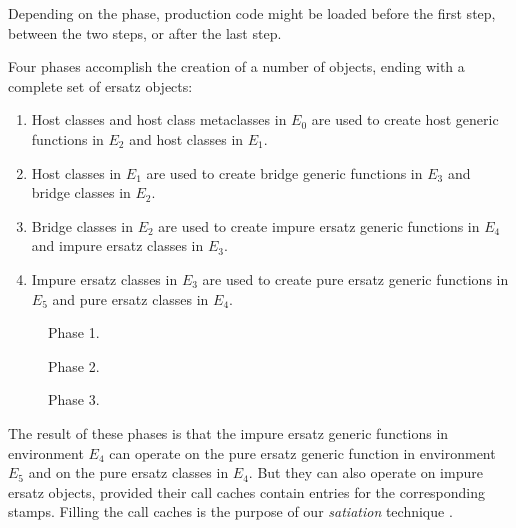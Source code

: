 Depending on the phase, \sicl{} production code might be loaded before
the first step, between the two steps, or after the last step.

Four phases accomplish the creation of a number of objects, ending
with a complete set of ersatz objects:

\begin{enumerate}
\item Host classes and host class metaclasses in $E_0$
  are used to create host generic functions in $E_2$ and host classes
  in $E_1$.
\item Host classes in $E_1$ are used to create bridge
  generic functions in $E_3$ and bridge classes in $E_2$.
\item Bridge classes in $E_2$ are used to create impure
  ersatz generic functions in $E_4$ and impure ersatz classes in
  $E_3$.
\item Impure ersatz classes in $E_3$ are used to create
  pure ersatz generic functions in $E_5$ and pure ersatz classes in
  $E_4$.
\end{enumerate}

\begin{figure}
\begin{center}
\end{center}
\caption{\label{fig-phase-1}
Phase 1.}
\end{figure}

\begin{figure}
\begin{center}
\end{center}
\caption{\label{fig-phase-2}
Phase 2.}
\end{figure}

\begin{figure}
\begin{center}
\end{center}
\caption{\label{fig-phase-3}
Phase 3.}
\end{figure}

The result of these phases is that the impure ersatz generic functions
in environment $E_4$ can operate on the pure ersatz generic function
in environment $E_5$ and on the pure ersatz classes in $E_4$.  But
they can also operate on impure ersatz objects, provided their call
caches contain entries for the corresponding stamps.  Filling the call
caches is the purpose of our \emph{satiation} technique
\cite{Strandh:2014:RMI:2635648.2635656}.

